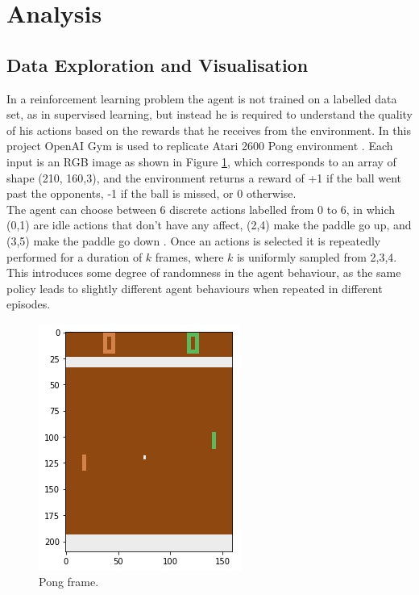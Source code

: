 \documentclass[a4paper, 11pt]{article}
\begin{document}
\section{Analysis}
\subsection{Data Exploration and Visualisation}\label{sec:data-exploration}
In a reinforcement learning problem the agent is not trained on a labelled data set, as in supervised learning, but instead he is required to understand the quality of his actions based on the rewards that he receives from the environment. In this project OpenAI Gym is used to replicate Atari 2600 Pong environment \cite{OpenAI}. Each input is an RGB image as shown in Figure \ref{fig:pong-frame}, which corresponds to an array of shape (210, 160,3), and the environment returns a reward of +1 if the ball went past the opponents, -1 if the ball is missed, or 0 otherwise.\\
The agent can choose between 6 discrete actions labelled from 0 to 6, in which (0,1) are idle actions that don't have any affect, (2,4) make the paddle go up, and (3,5) make the paddle go down \cite{PongActions}. Once an actions is selected it is repeatedly performed for a duration of $k$ frames, where $k$ is uniformly sampled from {2,3,4}. This introduces some degree of randomness in the agent behaviour, as the same policy leads to slightly different agent behaviours when repeated in different episodes.

\begin{figure}[!htb]
  \begin{center}
   \includegraphics[height=0.25\textheight]{Pong_raw.jpeg}
    \caption{Pong frame.}
    \label{fig:pong-frame}
  \end{center}
\end{figure}  
\end{document}
